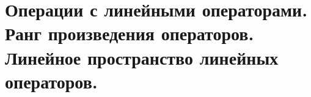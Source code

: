 \section{
    Операции с линейными операторами. Ранг произведения операторов. Линейное пространство линейных операторов.
}




\newpage





\newpage



